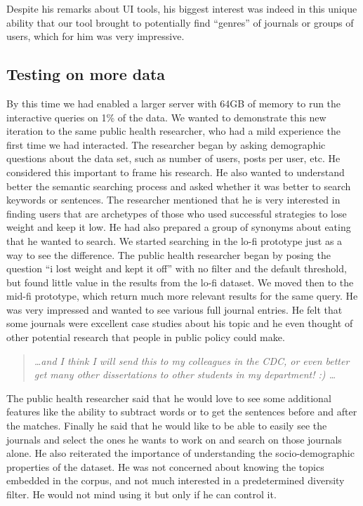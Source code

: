 \documentclass{sigchi}
\begin{document}
Despite his remarks about UI tools, his biggest interest was indeed in this unique ability that our tool brought to potentially find ``genres'' of journals or groups of users, which for him was very impressive.

\subsection{Testing on more data}

By this time we had enabled a larger server with  64GB of memory to run the interactive queries on 1\% of the data. We wanted to demonstrate this new iteration to the same public health researcher, who had a mild experience the first time we had interacted. 
The researcher began by asking demographic questions about the data set, such as number of users, posts per user, etc. He considered this important to frame his research. He also wanted to understand better the semantic searching process and asked whether it was better to search keywords or sentences. The researcher mentioned that he is very interested in finding users that are archetypes of those who used successful strategies to lose weight and keep it low. He had also prepared a group of synonyms about eating that he wanted to search. We started searching in the lo-fi prototype just as a way to see the difference. The public health researcher began by posing the question ``i lost weight and kept it off'' with no filter and the default threshold, but found little value in the results from the lo-fi dataset. We moved then to the mid-fi prototype, which return much more relevant results for the same query. He was very impressed and wanted to see various full journal entries. He felt that some journals were excellent case studies about his topic and he even thought of other potential research that people in public policy could make. 

\begin{quote}
{\em
\dots and I think I will send this to my colleagues in the CDC, or even better get many other dissertations to other students in my department! :) \dots
}\end{quote}

The public health researcher said that he would love to see some additional features like the ability to subtract words or to get the sentences before and after the matches. Finally he said that he would like to be able to easily see the journals and select the ones he wants to work on and search on those journals alone. He also reiterated the importance of understanding the socio-demographic properties of the dataset. He was not concerned about knowing the topics embedded in the corpus, and not much interested in a predetermined diversity filter. He would not mind using it but only if he can control it.
\end{document}
